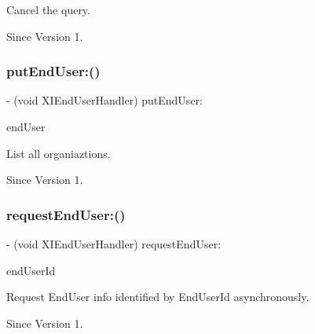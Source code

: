 Cancel the query. 

\begin{DoxySince}{Since}
Version 1. 
\end{DoxySince}
\hypertarget{protocol_x_i_end_user_handler_01-p_a61ca66b7f1ed59f8f2ccf0d082375f4e}{}\label{protocol_x_i_end_user_handler_01-p_a61ca66b7f1ed59f8f2ccf0d082375f4e} 
\subsubsection{\texorpdfstring{put\+End\+User\+:()}{putEndUser:()}}
{\footnotesize\ttfamily -\/ (void X\+I\+End\+User\+Handler) put\+End\+User\+: \begin{DoxyParamCaption}\item[{(\hyperlink{class_x_i_end_user_info}{X\+I\+End\+User\+Info} $\ast$)}]{end\+User }\end{DoxyParamCaption}}



List all organiaztions. 

\begin{DoxySince}{Since}
Version 1. 
\end{DoxySince}
\hypertarget{protocol_x_i_end_user_handler_01-p_a34bef6e14c8ebcfb2938939d4546b9bb}{}\label{protocol_x_i_end_user_handler_01-p_a34bef6e14c8ebcfb2938939d4546b9bb} 
\subsubsection{\texorpdfstring{request\+End\+User\+:()}{requestEndUser:()}}
{\footnotesize\ttfamily -\/ (void X\+I\+End\+User\+Handler) request\+End\+User\+: \begin{DoxyParamCaption}\item[{(N\+S\+String $\ast$)}]{end\+User\+Id }\end{DoxyParamCaption}}



Request End\+User info identified by End\+User\+Id asynchronously. 

\begin{DoxySince}{Since}
Version 1. 
\end{DoxySince}


